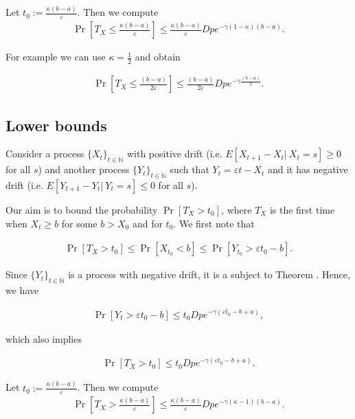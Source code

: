 \documentclass[12pt, a4paper]{article}
\theoremstyle{remark}
\theoremstyle{definition}
\begin{document}
Let $t_0 := \frac{\kappa (b - a)}{\varepsilon}$. Then we compute
\begin{align*}
    \Pr\left[T_X \leq \frac{\kappa (b - a)}{\varepsilon}\right] \leq \frac{\kappa (b - a)}{\varepsilon} D p e^{-\gamma(1 - \kappa)(b - a)}.
\end{align*}

For example we can use $\kappa = \frac{1}{2}$ and obtain

\begin{align*}
    \Pr\left[T_X \leq \frac{(b - a)}{2\varepsilon}\right] \leq \frac{(b - a)}{2\varepsilon} D p e^{-\gamma\frac{(b - a)}{2}}.
\end{align*}

\subsection{Lower bounds}

Consider a process $\{X_t\}_{t \in \mathbb{N}}$ with positive drift (i.e. $E[X_{t + 1} - X_t |\ X_t = s] \geq 0$ for all $s$) and another process $\{Y_t\}_{t \in \mathbb{N}}$ such that $Y_t = \varepsilon t - X_t$ and it has negative drift (i.e. $E[Y_{t + 1} - Y_t |\ Y_t = s] \leq 0$ for all $s$).

Our aim is to bound the probability $\Pr[T_X > t_0]$, where $T_X$ is the first time when $X_t \geq b$ for some $b > X_0$ and for $t_0$. We first note that

\begin{align*}
    \Pr[T_X > t_0] \leq \Pr[X_{t_0} < b] \leq \Pr[Y_{t_0} > \varepsilon t_0 - b].
\end{align*}

Since $\{Y_t\}_{t \in \mathbb{N}}$ is a process with negative drift, it is a subject to Theorem \cite{}. Hence, we have

\begin{align*}
    \Pr[Y_t > \varepsilon t_0 - b] \leq t_0 D p e^{-\gamma(\varepsilon t_0 - b + a)},
\end{align*}

which also implies

\begin{align*}
    \Pr[T_X > t_0] \leq t_0 D p e^{-\gamma(\varepsilon t_0 - b + a)}.
\end{align*}

Let $t_0 := \frac{\kappa (b - a)}{\varepsilon}$. Then we compute
\begin{align*}
    \Pr\left[T_X > \frac{\kappa (b - a)}{\varepsilon}\right] \leq \frac{\kappa (b - a)}{\varepsilon} D p e^{-\gamma(\kappa - 1)(b - a)}.
\end{align*}
\end{document}
